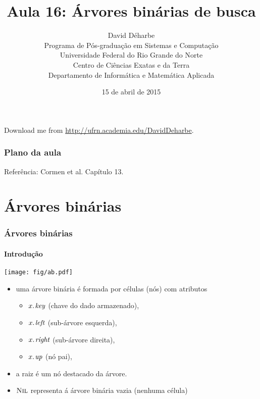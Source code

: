 \documentclass{beamer}
\title{Aula 16: Árvores binárias de busca}
\author{David Déharbe \\
  Programa de Pós-graduação em Sistemas e Computação \\
  Universidade Federal do Rio Grande do Norte \\
  Centro de Ciências Exatas e da Terra \\
  Departamento de Informática e Matemática Aplicada}
\date{15 de abril de 2015}
\begin{document}
\begin{frame}
  \titlepage
  Download me from \url{http://ufrn.academia.edu/DavidDeharbe}.
\end{frame}

\begin{frame}
  \frametitle{Plano da aula}
  \tableofcontents

  \alert{Referência}: Cormen et al. Capítulo 13.
\end{frame}

\section{Árvores binárias}

\begin{frame}

  \frametitle{Árvores binárias}
  \framesubtitle{Introdução}

  \begin{center}
    \texttt{[image: fig/ab.pdf]}
  \end{center}
  \begin{itemize}
    
  \item uma \alert{árvore binária} é formada por células (\alert{nós})
    com atributos
          
    \begin{itemize}

    \item $\attrib{x}{key}$ (chave do dado armazenado),

    \item $\attrib{x}{left}$ (sub-árvore esquerda),
      
    \item $\attrib{x}{right}$  (sub-árvore direita),
      
    \item $\attrib{x}{up}$ (nó pai),

    \end{itemize}

  \item a \alert{raiz} é um nó destacado da árvore.

  \item $\textnormal{\scshape Nil}$ representa á árvore binária vazia (nenhuma célula)

  \end{itemize}

\end{frame}
\end{document}
